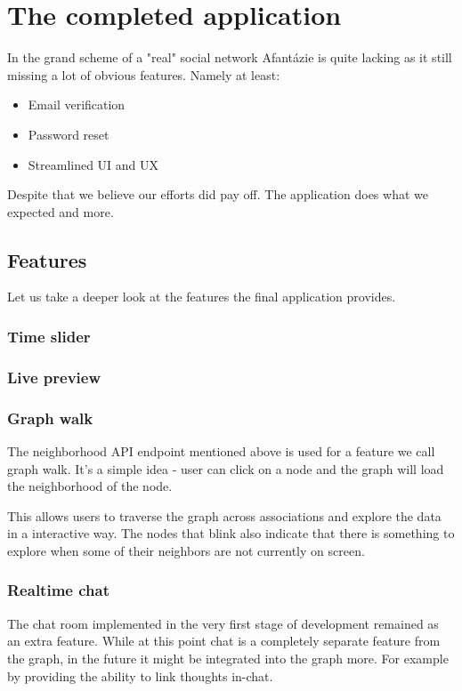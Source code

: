 \chapter{The completed application}
In the grand scheme of a "real" social network Afantázie is quite lacking as it still missing a lot of obvious features.
Namely at least:
\begin{itemize}
    \item Email verification 
    \item Password reset
    \item Streamlined UI and UX
\end{itemize}

Despite that we believe our efforts did pay off.
The application does what we expected and more.

\section{Features}
Let us take a deeper look at the features the final application provides.

\subsection{Time slider}

\subsection{Live preview}

\subsection{Graph walk}
The neighborhood API endpoint mentioned above is used for a feature we call graph walk.
It's a simple idea - user can click on a node and the graph will load the neighborhood of the node.

This allows users to traverse the graph across associations and explore the data in a interactive way.
The nodes that blink also indicate that there is something to explore when some of their neighbors are not currently on screen.

\subsection{Realtime chat}
The chat room implemented in the very first stage of development remained as an extra feature.
While at this point chat is a completely separate feature from the graph, in the future it might be integrated into the graph more.
For example by providing the ability to link thoughts in-chat.


